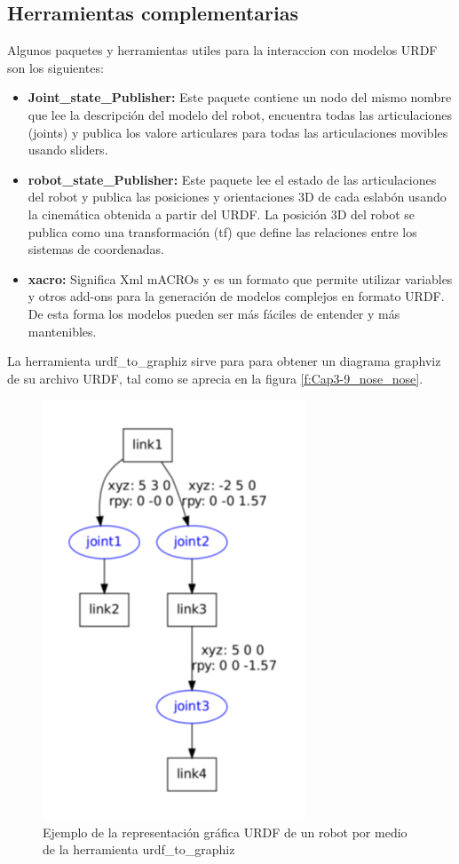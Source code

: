                                                 \newpage

    \subsection{Herramientas complementarias}
    
        Algunos paquetes y herramientas utiles para la interaccion con modelos URDF son los siguientes:
      
        \begin{itemize}
            \item \textbf{Joint\_state\_Publisher:} Este paquete contiene un nodo del mismo nombre que lee la descripción del modelo del robot, encuentra todas las articulaciones (joints) y publica los valore articulares para todas las articulaciones movibles usando sliders.
            \item \textbf{robot\_state\_Publisher:} Este paquete lee el estado de las articulaciones del robot y publica las posiciones y orientaciones 3D de cada eslabón usando la cinemática obtenida a partir del URDF. La posición 3D del robot se publica como una transformación (tf) que define las relaciones entre los sistemas de coordenadas.
            \item \textbf{xacro:} Significa Xml mACROs y es un formato que permite utilizar variables y otros add-ons para la generación de modelos complejos en formato URDF. De esta forma los modelos pueden ser más fáciles de entender y más mantenibles.
        \end{itemize}      
        
        La herramienta urdf\_to\_graphiz sirve para para obtener un diagrama graphviz de su archivo URDF, tal como se aprecia en la figura \eqref{f:Cap3-9_nose_nose}.
        
        \begin{figure}[htb]
            \centering
            \includegraphics[width=0.43\linewidth]{Main/Chapter3/Images3/3-9/Esquema-de-los-componentes-de-un-fichero-urdf.png}
            \caption{Ejemplo de la representación gráfica URDF de un robot por medio de la herramienta urdf\_to\_graphiz \cite{urdftutorials}}
            \label{f:Cap3-9_nose_nose}
        \end{figure} 
        
